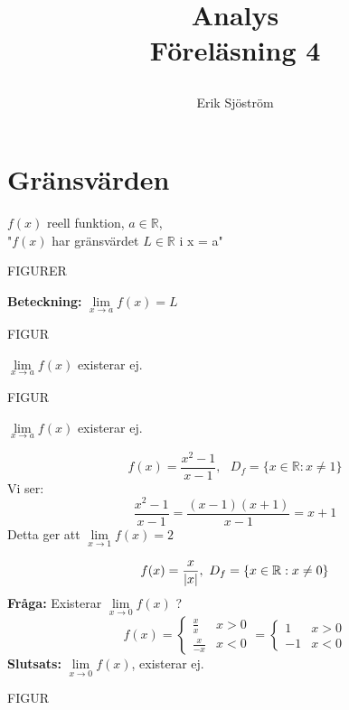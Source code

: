 

\title{
     Analys\\
     Föreläsning 4
    \author{Erik Sjöström}
}

\maketitle

\section{Gränsvärden} %
\label{sec:gr_nsv_rden}

$f(x)$ reell funktion, $a \in \mathbb{R}$, \\
"$f(x)$ har gränsvärdet $L \in \mathbb{R}$ i x = a"

\begin{center}
	FIGURER	
\end{center}
\textbf{Beteckning:} $\lim\limits_{x \rightarrow a} f(x) = L$
\begin{center}
	FIGUR
\end{center}
$\lim\limits_{x \rightarrow a} f(x)$ existerar ej.
\begin{center}
	FIGUR
\end{center}
$\lim\limits_{x \rightarrow a} f(x)$ existerar ej.

\begin{Ex}
    \[
    f(x) = \frac{x^2 - 1}{x - 1}, \mbox{ } D_f = \{x \in \mathbb{R}: x \neq 1\}
    \]
    Vi ser:
    \[
    \frac{x^2 -1}{x-1} = \frac{(x-1)(x+1)}{x-1} = x+1
    \]
    Detta ger att $\lim\limits_{x \rightarrow 1}f(x) = 2$
\end{Ex}

\begin{Ex}
    \[
    f(x) = \frac{x}{\lvert x\rvert}, \mbox{ } D_f = \{x \in \mathbb{R}: x \neq 0\}
    \]
    \textbf{Fråga: } Existerar $\lim\limits_{x \rightarrow 0}f(x)$ ?
    \[
    f(x) = 
    \begin{cases}
    	\frac{x}{x} & x > 0\\
    	\frac{x}{-x} & x < 0
    \end{cases}
    = 
    \begin{cases}
    	1 & x > 0\\
    	-1 & x < 0
    \end{cases}
    \]
    \textbf{Slutsats: } $\lim\limits_{x \to 0}f(x)$, existerar ej.
    \begin{center}
    	FIGUR
    \end{center}
\end{Ex}

